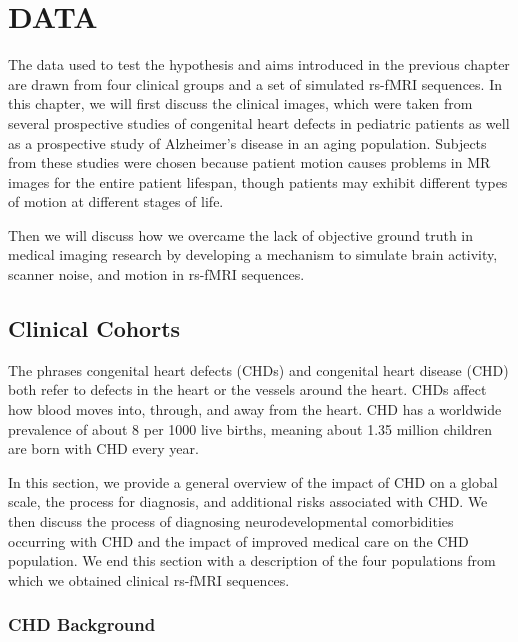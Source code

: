 \chapter{DATA}
\label{ch5:data}

The data used to test the hypothesis and aims introduced in the previous chapter are drawn from four clinical groups and  a set of simulated rs-fMRI sequences. In this chapter, we will first discuss the clinical images, which were taken from several prospective studies of congenital heart defects in pediatric patients as well as a prospective study of Alzheimer's disease in an aging population. Subjects from these studies were chosen because patient motion causes problems in MR images for the entire patient lifespan, though patients may exhibit different types of motion at different stages of life. 

Then we will discuss how we overcame the lack of objective ground truth in medical imaging research by developing a mechanism to simulate brain activity, scanner noise, and motion in rs-fMRI sequences.

\section{Clinical Cohorts}

The phrases congenital heart defects (CHDs) and congenital heart disease (CHD) both refer to defects in the heart or the vessels around the heart. CHDs affect how blood moves into, through, and away from the heart. 
CHD has a worldwide prevalence of about 8 per 1000 live births, meaning about 1.35 million children are born with CHD every year. %

In this section, we provide a general overview of the impact of CHD on a global scale, the process for diagnosis, and additional risks associated with CHD. We then discuss the process of diagnosing neurodevelopmental comorbidities occurring with CHD and the impact of improved medical care on the CHD population. We end this section with a description of the four populations from which we obtained clinical rs-fMRI sequences.


\subsection{CHD Background}

